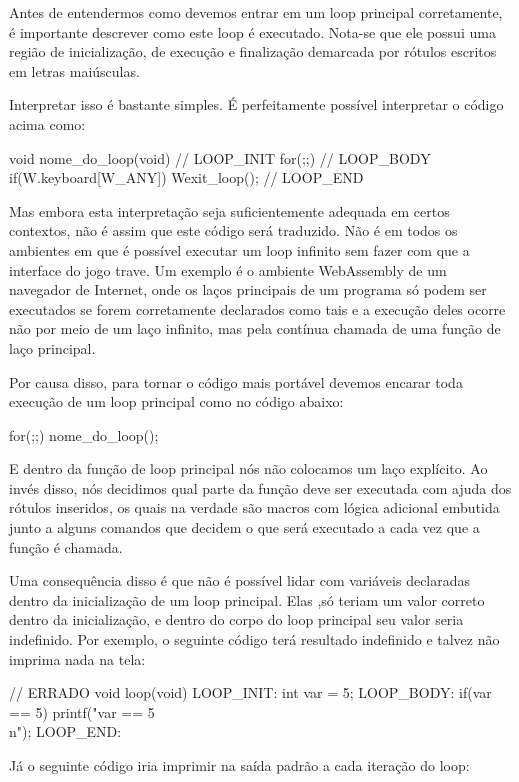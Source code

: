 Antes de entendermos como devemos entrar em um loop principal
corretamente, é importante descrever como este loop é
executado. Nota-se que ele possui uma região de inicialização, de
execução e finalização demarcada por rótulos escritos em letras
maiúsculas.

Interpretar isso é bastante simples. É perfeitamente possível
interpretar o código acima como:

\alinhaverbatim
void nome\_do\_loop(void){
  // LOOP\_INIT
  for(;;){
    // LOOP\_BODY
    if(W.keyboard[W\_ANY])
        Wexit\_loop();
  }
  // LOOP\_END
}
\alinhanormal

Mas embora esta interpretação seja suficientemente adequada em certos
contextos, não é assim que este código será traduzido. Não é em todos
os ambientes em que é possível executar um loop infinito sem fazer com
que a interface do jogo trave. Um exemplo é o ambiente WebAssembly de
um navegador de Internet, onde os laços principais de um programa só
podem ser executados se forem corretamente declarados como tais e a
execução deles ocorre não por meio de um laço infinito, mas pela
contínua chamada de uma função de laço principal.

Por causa disso, para tornar o código mais portável devemos encarar
toda execução de um loop principal como no código abaixo:

\alinhaverbatim
for(;;)
  nome\_do\_loop();
\alinhanormal

E dentro da função de loop principal nós não colocamos um laço
explícito. Ao invés disso, nós decidimos qual parte da função deve ser
executada com ajuda dos rótulos inseridos, os quais na verdade são
macros com lógica adicional embutida junto a alguns
comandos  que decidem o que será executado a cada vez
que a função é chamada.

Uma consequência disso é que não é possível lidar com variáveis
declaradas dentro da inicialização de um loop principal. Elas ,só
teriam um valor correto dentro da inicialização, e dentro do corpo do
loop principal seu valor seria indefinido. Por exemplo, o seguinte
código terá resultado indefinido e talvez não imprima nada na tela:

\alinhaverbatim
// ERRADO
void loop(void){
LOOP\_INIT:
  int var = 5;
LOOP\_BODY:
  if(var == 5)
    printf("var == 5\\n");
LOOP\_END:
}
\alinhanormal

Já o seguinte código iria imprimir na saída padrão a cada iteração do
loop:

